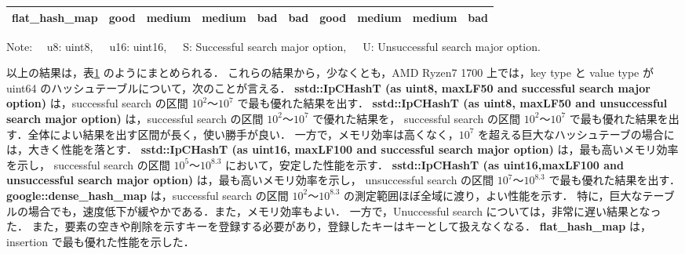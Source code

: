\begin{table}
\begin{center}
\begin{tabular}{c|c|ccc|ccc|c|c}
        flat\_hash\_map        & \cellcolor{cGood}good   & \cellcolor{cMedi}medium & \cellcolor{cMedi}medium & \cellcolor{cBad }bad    & \cellcolor{cBad }bad    & \cellcolor{cGood}good   & \cellcolor{cMedi}medium  & \cellcolor{cMedi}medium & \cellcolor{cBad }bad  \rule[0pt]{0pt}{15pt} \\ \hline
    \end{tabular}
    Note: \ \ u8: uint8,\ \ \ u16: uint16,\ \ \ S: Successful search major option,\ \ \ U: Unsuccessful search major option.
    \label{table_hashT_cmp}
  \end{center}
\end{table}

以上の結果は，表\ref{table_hashT_cmp} のようにまとめられる．
これらの結果から，少なくとも，AMD Ryzen7 1700 上では，key type と value type が uint64 のハッシュテーブルについて，次のことが言える．
{\bf sstd::IpCHashT (as uint8, maxLF50 and successful search major option)} は，successful search の区間 $10^2〜10^7$ で最も優れた結果を出す．
{\bf sstd::IpCHashT (as uint8, maxLF50 and unsuccessful search major option)} は，successful search の区間 $10^2〜10^7$ で優れた結果を，
successful search の区間 $10^2〜10^7$ で最も優れた結果を出す．全体によい結果を出す区間が長く，使い勝手が良い．
一方で，メモリ効率は高くなく，$10^7$ を超える巨大なハッシュテーブの場合には，大きく性能を落とす．
{\bf sstd::IpCHashT (as uint16, maxLF100 and successful search major option)} は，最も高いメモリ効率を示し，
successful search の区間 $10^5〜10^{8.3}$ において，安定した性能を示す．
{\bf sstd::IpCHashT (as uint16,maxLF100 and unsuccessful search major option)} は，最も高いメモリ効率を示し，
unsuccessful search の区間 $10^7〜10^{8.3}$ で最も優れた結果を出す．
{\bf google::dense\_hash\_map} は，successful search の区間 $10^2〜10^{8.3}$ の測定範囲ほぼ全域に渡り，よい性能を示す．
特に，巨大なテーブルの場合でも，速度低下が緩やかである．また，メモリ効率もよい．
一方で，Unuccessful search については，非常に遅い結果となった．
また，要素の空きや削除を示すキーを登録する必要があり，登録したキーはキーとして扱えなくなる．
{\bf flat\_hash\_map} は，insertion で最も優れた性能を示した．







